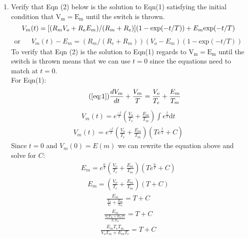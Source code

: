 \documentclass[11pt]{article}
\begin{document}
\begin{enumerate}[label=\arabic*.]
\begin{enumerate}[label=(\alph*)]
\newpage
\item
Verify that Eqn (2) below is the solution to Eqn(1) satisfying the initial condition that $\text{V}_\text{m} = \text{E}_\text{m}$ until the switch is thrown. \\
\begin{equation}
\label{eq:2}
V_m(t) = [(R_m V_o + R_e E_m) / (R_m + R_e)] (1 - \text{exp}(-t / T)) + E_m \text{exp}(-t / T) \\
\end{equation}
\begin{align*}
\text{or} && V_m(t) - E_m = (R_m / (R_e+ R_m)) (V_o - E_m) (1 - \text{exp}(-t / T))
\end{align*}
To verify that Eqn (2) is the solution to Eqn(1) regards to $\text{V}_\text{m} = \text{E}_\text{m}$ until the switch is thrown means that we can use $t = 0$ since the equations need to match at $t = 0$.
\vspace*{1\baselineskip}
\\
For Eqn(1):
\begin{equation}
\tag{\ref{eq:1}}
\frac{dV_m} {dt} + \frac{V_m} {T} = \frac{V_o} {T_e} + \frac{E_m} {T_m}
\end{equation}
\begin{align*}
V_m(t) = e^{\frac{-t} {T}} \left(\frac{V_o} {T_e} + \frac{E_m} {T_m}\right) \int e^{\frac{t} {T}}\mathrm{d}t
\end{align*}
\begin{align*}
V_m(t) = e^{\frac{-t} {T}} \left(\frac{V_o} {T_e} + \frac{E_m} {T_m}\right)\left(Te^{\frac{t} {T}} + C\right)
\end{align*}
Since $t = 0$ and $V_m(0) = E(m)$ we can rewrite the equation above and solve for $C$:
\begin{align*}
E_m = e^{\frac{0} {T}} \left(\frac{V_o} {T_e} + \frac{E_m} {T_m}\right)\left(Te^{\frac{0} {T}} + C\right)
\end{align*}
\begin{align*}
E_m = \left(\frac{V_o} {T_e} + \frac{E_m} {T_m}\right)\left(T + C\right)
\end{align*}
\begin{align*}
\frac{E_m} {\frac{V_o} {T_e} + \frac{E_m} {T_m}} = T + C
\end{align*}
\begin{align*}
\frac{E_m} {\frac{V_o T_m + E_m T_e} {T_e T_m}} = T + C
\end{align*}
\begin{align*}
\frac{E_m T_e T_m} {V_o T_m + E_m T_e} = T + C
\end{align*}

\end{enumerate}
\end{enumerate}
\end{document}
